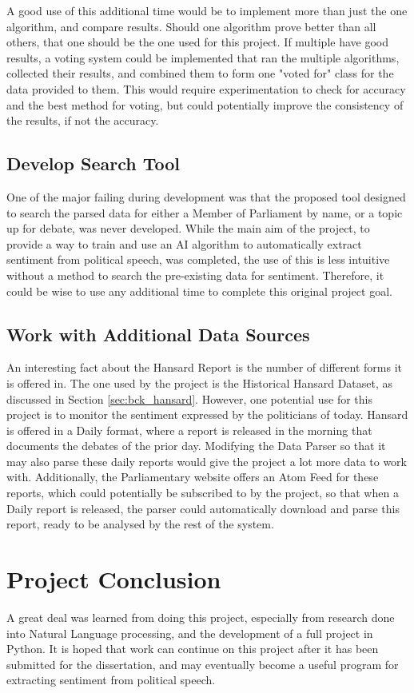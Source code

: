 A good use of this additional time would be to implement more than just the one algorithm, and compare results. Should one algorithm prove better than all others, that one should be the one used for this project. If multiple have good results, a voting system could be implemented that ran the multiple algorithms, collected their results, and combined them to form one "voted for" class for the data provided to them. This would require experimentation to check for accuracy and the best method for voting, but could potentially improve the consistency of the results, if not the accuracy.

\subsection{Develop Search Tool}

One of the major failing during development was that the proposed tool designed to search the parsed data for either a Member of Parliament by name, or a topic up for debate, was never developed. While the main aim of the project, to provide a way to train and use an AI algorithm to automatically extract sentiment from political speech, was completed, the use of this is less intuitive without a method to search the pre-existing data for sentiment. Therefore, it could be wise to use any additional time to complete this original project goal.

\subsection{Work with Additional Data Sources}

An interesting fact about the Hansard Report is the number of different forms it is offered in. The one used by the project is the Historical Hansard Dataset, as discussed in Section \ref{sec:bck_hansard}. However, one potential use for this project is to monitor the sentiment expressed by the politicians of today. Hansard is offered in a Daily format, where a report is released in the morning that documents the debates of the prior day. Modifying the Data Parser so that it may also parse these daily reports would give the project a lot more data to work with. Additionally, the Parliamentary website offers an Atom Feed for these reports, which could potentially be subscribed to by the project, so that when a Daily report is released, the parser could automatically download and parse this report, ready to be analysed by the rest of the system.

\section{Project Conclusion}

A great deal was learned from doing this project, especially from research done into Natural Language processing, and the development of a full project in Python. It is hoped that work can continue on this project after it has been submitted for the dissertation, and may eventually become a useful program for extracting sentiment from political speech.